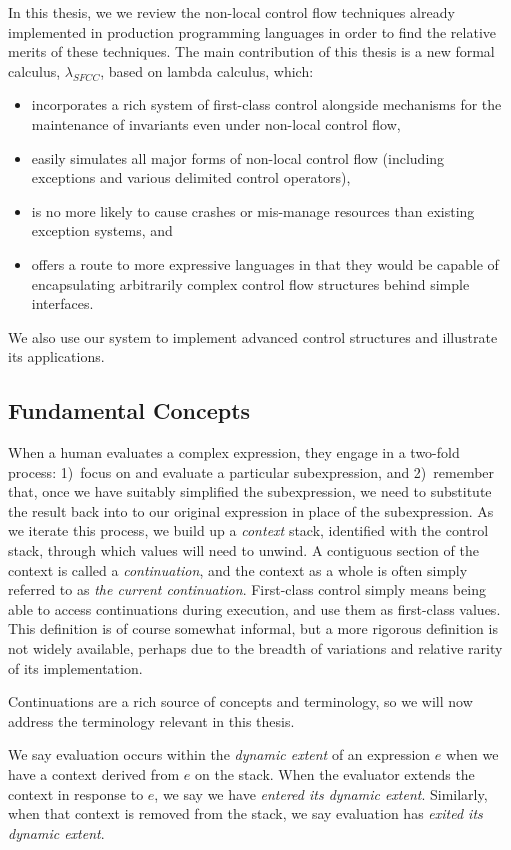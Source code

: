 \documentclass[11pt]{article}
\newcommand{\maybePage}{\newpage}
\begin{document}
In this thesis, we we review the non-local control flow techniques already implemented in production programming languages in order to find the relative merits of these techniques.
The main contribution of this thesis is a new formal calculus, $\lambda_{SFCC}$, based on lambda calculus, which:
\begin{itemize}
\item incorporates a rich system of first-class control alongside mechanisms for the maintenance of invariants even under non-local control flow,
\item easily simulates all major forms of non-local control flow (including exceptions and various delimited control operators),
\item is no more likely to cause crashes or mis-manage resources than existing exception systems, and
\item offers a route to more expressive languages in that they would be capable of encapsulating arbitrarily complex control flow structures behind simple interfaces.
\end{itemize}
We also use our system to implement advanced control structures and illustrate its applications.

\maybePage
\subsection{Fundamental Concepts}
When a human evaluates a complex expression, they engage in a two-fold process: 1)~focus on and evaluate a particular subexpression, and 2)~remember that, once we have suitably simplified the subexpression, we need to substitute the result back into to our original expression in place of the subexpression.
As we iterate this process, we build up a \emph{context} stack, identified with the control stack, through which values will need to unwind.
A contiguous section of the context is called a \emph{continuation}, and the context as a whole is often simply referred to as \emph{the current continuation}.
First-class control simply means being able to access continuations during execution, and use them as first-class values.
This definition is of course somewhat informal, but a more rigorous definition is not widely available, perhaps due to the breadth of variations and relative rarity of its implementation.

Continuations are a rich source of concepts and terminology, so we will now address the terminology relevant in this thesis.

We say evaluation occurs within the \emph{dynamic extent} of an expression $e$ when we have a context derived from $e$ on the stack.
When the evaluator extends the context in response to $e$, we say we have \emph{entered its dynamic extent}.
Similarly, when that context is removed from the stack, we say evaluation has \emph{exited its dynamic extent}.
\end{document}
